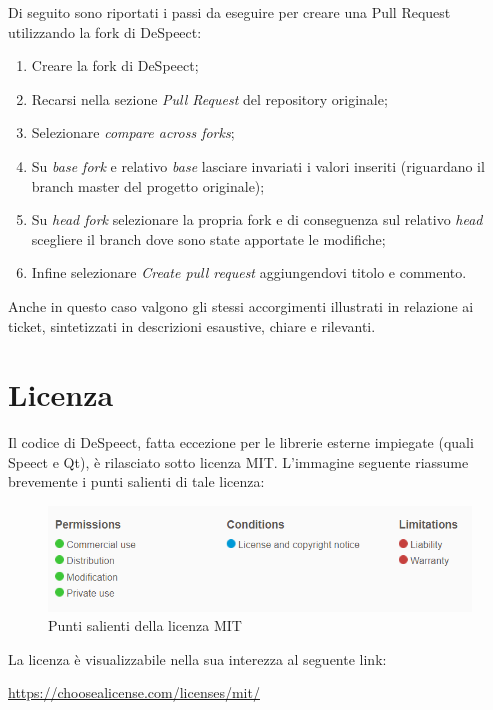 \documentclass[openany,12pt,a4paper]{report}
\begin{document}
	Di seguito sono riportati i passi da eseguire per creare una Pull
	Request utilizzando la fork di DeSpeect:
	\begin{enumerate}
		\item Creare la fork di DeSpeect;
		\item Recarsi nella sezione \textit{Pull Request} del repository originale;
		\item Selezionare \textit{compare across forks};
		\item Su \textit{base fork} e relativo \textit{base} lasciare invariati i valori inseriti (riguardano il branch master del progetto originale);
		\item Su \textit{head fork} selezionare la propria fork e di conseguenza sul relativo \textit{head} scegliere
		il branch dove sono state apportate le modifiche;
		\item Infine selezionare \textit{Create pull request} aggiungendovi titolo e commento.
	\end{enumerate}
	Anche in questo caso valgono gli stessi accorgimenti illustrati in relazione ai ticket, sintetizzati in descrizioni esaustive, chiare e rilevanti.
	
	\chapter{Licenza}
	
	Il codice di DeSpeect, fatta eccezione per le librerie esterne impiegate (quali Speect e Qt), è rilasciato sotto licenza MIT. L'immagine seguente riassume brevemente i punti salienti di tale licenza:
	
	\begin{figure}[H]
		\hspace*{-5mm}
		\includegraphics[scale=1]{licenza}
		\centering
		\caption{Punti salienti della licenza MIT}
	\end{figure}
	
	La licenza è visualizzabile nella sua interezza al seguente link:
	\begin{center}
		\url{https://choosealicense.com/licenses/mit/}
	\end{center} 

	\printglossary[style=glossaryStyle, nonumberlist]
	
\end{document}
